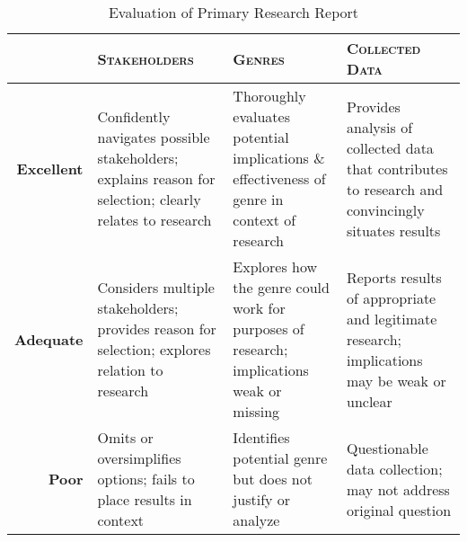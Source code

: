 \documentclass[10pt]{amsart}	%
\begin{document}
\begin{table}[b]
	\caption{Evaluation of Primary Research Report}\label{tab:rubric}
	\small
\begin{tabulary}{\textwidth}{rLLL}
	\toprule  & \textbf{\textsc{Stakeholders}} 
	& \textbf{\textsc{Genres}}
	& \textbf{\textsc{Collected Data}}
	\\
\midrule	\textbf{Excellent} 
& Confidently navigates possible stakeholders; explains reason for selection; clearly relates to research 
& Thoroughly evaluates potential implications \& effectiveness of genre in context of research
& Provides analysis of collected data that contributes to research and convincingly situates results
\\
\midrule	\textbf{Adequate} 
& Considers multiple stakeholders; provides reason for selection; explores relation to research 
& Explores how the genre could work for purposes of research; implications weak or missing
& Reports results of appropriate and legitimate research; implications may be weak or unclear
\\
\midrule	\textbf{Poor} 
& Omits or oversimplifies options; fails to place results in context 
& Identifies potential genre but does not justify or analyze
& Questionable data collection; may not address original question
\\
	\bottomrule
\end{tabulary}
\end{table}

\end{document}
